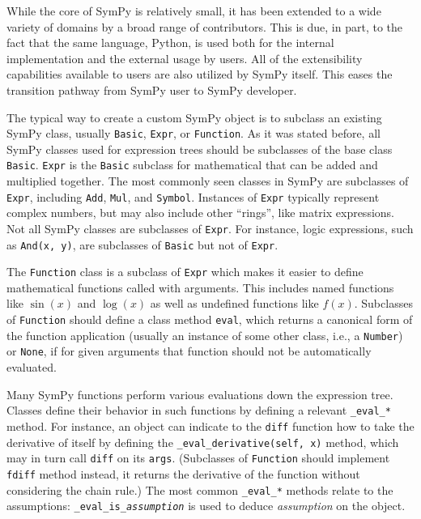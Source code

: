 While the core of SymPy is relatively small, it has been extended to a wide variety
of domains by a broad range of contributors.
This is due, in part, to the fact that the same language, Python,
is used both for the internal implementation and the external usage by users.
All of the extensibility capabilities available to
users are also utilized by SymPy itself. This eases the transition pathway from
SymPy user to SymPy developer.

The typical way to create a custom SymPy object is to subclass an existing
SymPy class, usually \texttt{Basic}, \texttt{Expr}, or \texttt{Function}. As
it was stated before, all SymPy classes used for expression trees should be
subclasses of the base class \texttt{Basic}. \texttt{Expr} is the
\texttt{Basic} subclass for mathematical that can be added and multiplied
together. The most commonly seen classes in SymPy are subclasses of
\texttt{Expr}, including \texttt{Add}, \texttt{Mul}, and \texttt{Symbol}.
Instances of \texttt{Expr} typically represent complex numbers, but may also
include other ``rings'', like matrix expressions. Not all SymPy classes are
subclasses of \texttt{Expr}. For instance, logic expressions, such as
\verb|And(x, y)|, are subclasses of \texttt{Basic} but not of \texttt{Expr}.

The \texttt{Function} class is a subclass of \texttt{Expr} which makes it
easier to define mathematical functions called with arguments. This includes
named functions like $\sin(x)$ and $\log(x)$ as well as undefined functions
like $f(x)$. Subclasses of \texttt{Function} should define a
class method \texttt{eval}, which returns a canonical form of the function
application (usually an instance of some other class, i.e., a \texttt{Number})
or \texttt{None}, if for given arguments that function should not be
automatically evaluated.

Many SymPy functions perform various evaluations down the expression tree.
Classes define their behavior in such functions by defining a relevant
\verb|_eval_|\texttt{\textit{*}} method. For instance, an object can indicate
to the \texttt{diff} function how to take the derivative of itself by defining
the \verb|_eval_derivative(self, x)| method, which may in turn call
\texttt{diff} on its \texttt{args}. (Subclasses of \texttt{Function} should
implement \texttt{fdiff} method instead, it returns the derivative of the function
without considering the chain rule.) The most common
\verb|_eval_|\texttt{\textit{*}} methods relate to the assumptions:
\verb|_eval_is_|\texttt{\textit{assumption}} is used to deduce
\textit{assumption} on the object.

